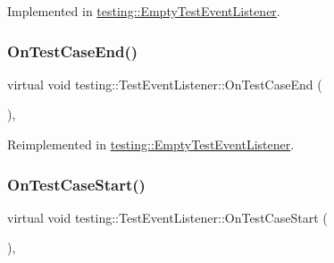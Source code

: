 Implemented in \hyperlink{classtesting_1_1EmptyTestEventListener_a320780451eac9178434b7c77d948ecbd}{testing\+::\+Empty\+Test\+Event\+Listener}.

\mbox{\label{classtesting_1_1TestEventListener_a6cada1572dde8010b94f6dd237ce52f4}} 
\subsubsection{\texorpdfstring{On\+Test\+Case\+End()}{OnTestCaseEnd()}}
{\footnotesize\ttfamily virtual void testing\+::\+Test\+Event\+Listener\+::\+On\+Test\+Case\+End (\begin{DoxyParamCaption}\item[{const Test\+Case \&}]{ }\end{DoxyParamCaption})\hspace{0.3cm}{\ttfamily [inline]}, {\ttfamily [virtual]}}



Reimplemented in \hyperlink{classtesting_1_1EmptyTestEventListener_abe05cc74c1081ed51e2c84b73013299e}{testing\+::\+Empty\+Test\+Event\+Listener}.

\mbox{\label{classtesting_1_1TestEventListener_ac48628c9f78d3e10bff77c7366e9e780}} 
\subsubsection{\texorpdfstring{On\+Test\+Case\+Start()}{OnTestCaseStart()}}
{\footnotesize\ttfamily virtual void testing\+::\+Test\+Event\+Listener\+::\+On\+Test\+Case\+Start (\begin{DoxyParamCaption}\item[{const Test\+Case \&}]{ }\end{DoxyParamCaption})\hspace{0.3cm}{\ttfamily [inline]}, {\ttfamily [virtual]}}



